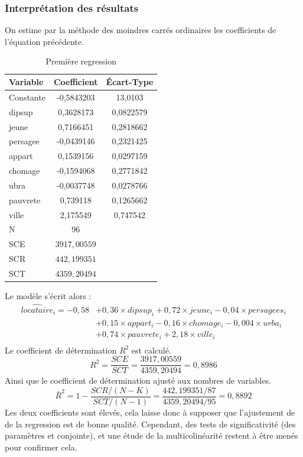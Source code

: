 \documentclass{article}
\begin{document}
\subsubsection{Interprétation des résultats }
On estime par la méthode des moindres carrés ordinaires les coefficients de l'équation précédente.
\begin{table}[H]
\centering
\caption{Première regression}
\begin{tabular}{l*{1}{cc}}
\toprule
Variable            & Coefficient         &  Écart-Type\\
\midrule
Constante &  -0,5843203 &  13,0103\\
dipsup	& 0,3628173	& 0,0822579\\
jeune  & 0,7166451 & 0,2818662\\
persagee&  -0,0439146 & 0,2321425\\
appart& 0,1539156 & 0,0297159\\
chomage& -0,1594068 & 0,2771842\\
ubra& -0,0037748 & 0,0278766\\
pauvrete& 0,739118& 0,1265662\\
ville &   2,175549  &  0,747542\\
\midrule
N&          96         &            \\
SCE & $3917,00559$ \\
SCR & $442,199351$ \\
SCT & $4359,20494$ \\
\bottomrule
\end{tabular}
\end{table}
Le modèle s'écrit alors : 
\begin{equation*}
    \begin{split}
			\hat{locataire}_i =  -0,58 &+ 0,36 \times dipsup_i + 0,72 \times jeune_i - 0,04 \times persagees_i \\
            &+ 0,15 \times appart_i -0,16 \times chomage_i - 0,004 \times urba_i \\ 
			& + 0,74 \times pauvrete_i + 2,18 \times ville_i \\
    \end{split}
\end{equation*}
Le coefficient de détermination $R^{2}$ est calculé.
\begin{equation*}
    R^{2} = \frac{SCE}{SCT} = \frac{3917,00559}{4359,20494} = 0,8986
\end{equation*}
Ainsi que le coefficient de détermination ajusté aux nombres de variables.
\begin{equation*}
    \bar{R}^{2} = 1 - \frac{SCR/(N-K)}{SCT/(N-1)} = \frac{442,199351/87}{4359,20494/95} = 0,8892
\end{equation*}
Les deux coefficients sont élevés, cela laisse donc à supposer que l'ajustement de de la regression est de bonne qualité. Cependant, des tests de 
significativité (des paramètres et conjointe), et une étude de la multicolinéarité restent à être menés pour confirmer cela.
\end{document}
